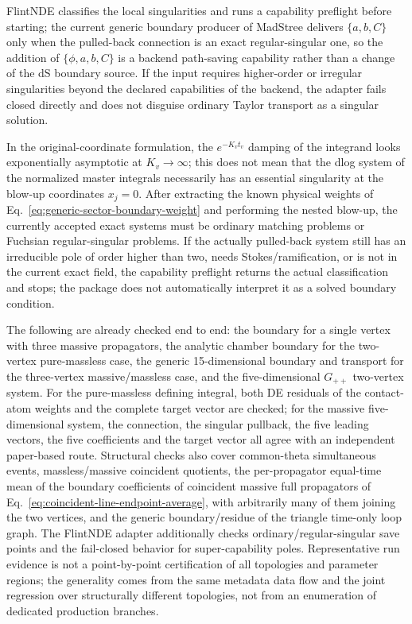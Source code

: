 \documentclass[11pt,a4paper]{article}
\begin{document}
FlintNDE classifies the local singularities and runs a capability preflight before starting; the current generic boundary producer of MadStree delivers $\{a,b,C\}$ only when the pulled-back connection is an exact regular-singular one, so the addition of $\{\phi,a,b,C\}$ is a backend path-saving capability rather than a change of the dS boundary source. If the input requires higher-order or irregular singularities beyond the declared capabilities of the backend, the adapter fails closed directly and does not disguise ordinary Taylor transport as a singular solution.

In the original-coordinate formulation, the $e^{-K_vt_v}$ damping of the integrand looks exponentially asymptotic at $K_v\to\infty$; this does not mean that the dlog system of the normalized master integrals necessarily has an essential singularity at the blow-up coordinates $x_j=0$. After extracting the known physical weights of Eq.~\eqref{eq:generic-sector-boundary-weight} and performing the nested blow-up, the currently accepted exact systems must be ordinary matching problems or Fuchsian regular-singular problems. If the actually pulled-back system still has an irreducible pole of order higher than two, needs Stokes/ramification, or is not in the current exact field, the capability preflight returns the actual classification and stops; the package does not automatically interpret it as a solved boundary condition.

The following are already checked end to end: the \cite{Chen:2024jms} boundary for a single vertex with three massive propagators, the analytic chamber boundary for the two-vertex pure-massless case, the generic 15-dimensional boundary and transport for the three-vertex massive/massless case, and the five-dimensional $G_{++}$ two-vertex system. For the pure-massless defining integral, both DE residuals of the contact-atom weights and the complete target vector are checked; for the massive five-dimensional system, the connection, the singular pullback, the five leading vectors, the five coefficients and the target vector all agree with an independent paper-based route. Structural checks also cover common-theta simultaneous events, massless/massive coincident quotients, the per-propagator equal-time mean of the boundary coefficients of coincident massive full propagators of Eq.~\eqref{eq:coincident-line-endpoint-average}, with arbitrarily many of them joining the two vertices, and the generic boundary/residue of the triangle time-only loop graph. The FlintNDE adapter additionally checks ordinary/regular-singular save points and the fail-closed behavior for super-capability poles. Representative run evidence is not a point-by-point certification of all topologies and parameter regions; the generality comes from the same metadata data flow and the joint regression over structurally different topologies, not from an enumeration of dedicated production branches.
\end{document}
